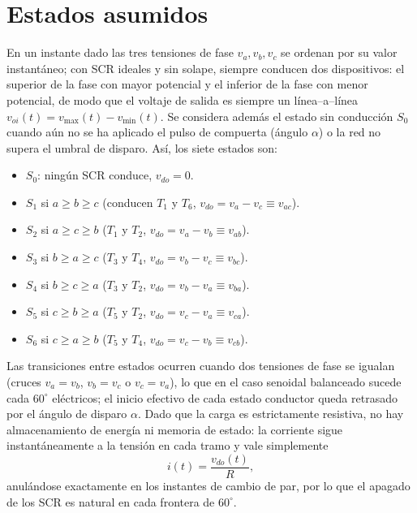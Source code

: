 \documentclass[conference]{IEEEtran}
\begin{document}
\section{Estados asumidos}

	En un instante dado las tres tensiones de fase $v_a,v_b,v_c$ se ordenan por su valor instantáneo; con SCR ideales y sin solape, siempre conducen dos dispositivos: el superior de la fase con mayor potencial y el inferior de la fase con menor potencial, de modo que el voltaje de salida es siempre un línea–a–línea $v_{oi}(t)=v_{\max}(t)-v_{\min}(t)$. Se considera además el estado sin conducción $S_0$ cuando aún no se ha aplicado el pulso de compuerta (ángulo $\alpha$) o la red no supera el umbral de disparo. Así, los siete estados son: 
	
	\begin{itemize}
		\item $S_0$: ningún SCR conduce, $v_{do}=0$.
		\item $S_1$ si $a\ge b\ge c$ (conducen \(T_1\) y \(T_6\), \(v_{do}=v_a-v_c\equiv v_{ac}\)).
		\item \(S_2\) si \(a\ge c\ge b\) (\(T_1\) y \(T_2\), \(v_{do}=v_a-v_b\equiv v_{ab}\)).
		\item \(S_3\) si \(b\ge a\ge c\) (\(T_3\) y \(T_4\), \(v_{do}=v_b-v_c\equiv v_{bc}\)).
		\item \(S_4\) si \(b\ge c\ge a\) (\(T_3\) y \(T_2\), \(v_{do}=v_b-v_a\equiv v_{ba}\)).
		\item \(S_5\) si \(c\ge b\ge a\) (\(T_5\) y \(T_2\), \(v_{do}=v_c-v_a\equiv v_{ca}\)).
		\item \(S_6\) si \(c\ge a\ge b\) (\(T_5\) y \(T_4\), \(v_{do}=v_c-v_b\equiv v_{cb}\)). 
	\end{itemize}

	Las transiciones entre estados ocurren cuando dos tensiones de fase se igualan (cruces $v_a=v_b$, $v_b=v_c$ o $v_c=v_a$), lo que en el caso senoidal balanceado sucede cada $60^\circ$ eléctricos; el inicio efectivo de cada estado conductor queda retrasado por el ángulo de disparo $\alpha$. Dado que la carga es estrictamente resistiva, no hay almacenamiento de energía ni memoria de estado: la corriente sigue instantáneamente a la tensión en cada tramo y vale simplemente
		\begin{equation*}
			i(t)=\frac{v_{do}(t)}{R},
		\end{equation*}
	anulándose exactamente en los instantes de cambio de par, por lo que el apagado de los SCR es natural en cada frontera de \(60^\circ\).
\end{document}
